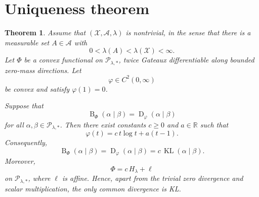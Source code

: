 \documentclass[11pt]{article}
\newtheorem{theorem}{Theorem}
\newcommand{\X}{\mathcal X}
\newcommand{\A}{\mathcal A}
\newcommand{\Pcal}{\mathcal P}
\newcommand{\KL}{\operatorname{KL}}
\newcommand{\Breg}{\operatorname{B}}
\newcommand{\Dphi}{\operatorname{D}}
\newcommand{\1}{\mathbf 1}
\begin{document}
\section{Uniqueness theorem}

\begin{theorem}
Assume that \((\X,\A,\lambda)\) is nontrivial, in the sense that there is a
measurable set \(A\in\A\) with
\[
0<\lambda(A)<\lambda(\X)<\infty.
\]
Let \(\Phi\) be a convex functional on \(\Pcal_{\lambda,*}\), twice
Gateaux differentiable along bounded zero-mass directions. Let
\[
\varphi\in C^2(0,\infty)
\]
be convex and satisfy \(\varphi(1)=0\).

Suppose that
\[
\Breg_\Phi(\alpha\mid\beta)
=
\Dphi_\varphi(\alpha\mid\beta)
\]
for all \(\alpha,\beta\in\Pcal_{\lambda,*}\). Then there exist constants
\(c\geq 0\) and \(a\in\mathbb R\) such that
\[
\varphi(t)
=
c\,t\log t+a(t-1).
\]
Consequently,
\[
\Breg_\Phi(\alpha\mid\beta)
=
\Dphi_\varphi(\alpha\mid\beta)
=
c\,\KL(\alpha\mid\beta).
\]
Moreover,
\[
\Phi
=
c\,H_\lambda+\ell
\]
on \(\Pcal_{\lambda,*}\), where \(\ell\) is affine. Hence, apart from the
trivial zero divergence and scalar multiplication, the only common divergence is
KL.
\end{theorem}
\end{document}
